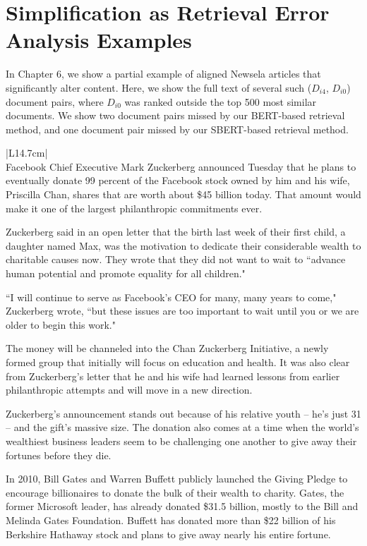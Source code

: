 \section{Simplification as Retrieval Error Analysis Examples} \label{app:retrieval_errors}

In Chapter 6, we show a partial example of aligned Newsela articles that significantly alter content. Here, we show the full text of several such ($D_{i4}$, $D_{i0}$) document pairs, where $D_{i0}$ was ranked outside the top 500 most similar documents. We show two document pairs missed by our BERT-based retrieval method, and one document pair missed by our SBERT-based retrieval method.

\begin{table}
\begin{center}
\begin{tabular}{|L{14.7cm}|}\hline
{} \\ \hline
\tiny Facebook Chief Executive Mark Zuckerberg announced Tuesday that he plans to eventually donate 99 percent of the Facebook stock owned by him and his wife, Priscilla Chan, shares that are worth about \$45 billion today. That amount would make it one of the largest philanthropic commitments ever.

Zuckerberg said in an open letter that the birth last week of their first child, a daughter named Max, was the motivation to dedicate their considerable wealth to charitable causes now. They wrote that they did not want to wait to ``advance human potential and promote equality for all children."

``I will continue to serve as Facebook's CEO for many, many years to come," Zuckerberg wrote, ``but these issues are too important to wait until you or we are older to begin this work."

The money will be channeled into the Chan Zuckerberg Initiative, a newly formed group that initially will focus on education and health. It was also clear from Zuckerberg's letter that he and his wife had learned lessons from earlier philanthropic attempts and will move in a new direction.

Zuckerberg's announcement stands out because of his relative youth -- he's just 31 -- and the gift's massive size. The donation also comes at a time when the world's wealthiest business leaders seem to be challenging one another to give away their fortunes before they die.

In 2010, Bill Gates and Warren Buffett publicly launched the Giving Pledge to encourage billionaires to donate the bulk of their wealth to charity. Gates, the former Microsoft leader, has already donated \$31.5 billion, mostly to the Bill and Melinda Gates Foundation. Buffett has donated more than \$22 billion of his Berkshire Hathaway stock and plans to give away nearly his entire fortune.


\end{tabular}
\end{center}
\end{table}
